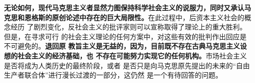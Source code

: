 \textbf{无论如何，现代马克思主义者显然力图保持科学社会主义的说服力，同时又承认马
  克思和恩格斯的原创论述中存在的巨大局限性。}在此过程中，后资本主义社会的概念经历
了剧烈变化，反社会主义的批评家则可以宣称取得了理论上的重大胜利。但是，在寻求可行
的社会主义理论的任何方案中，对这些有效的批判作出回应是不可避免的。\textbf{退回原
  教旨主义是无益的，因为，目前既不存在古典马克思主义设想的社会主义的经济基础，也
  不存在可能努力实现它的任何机构。}市场社会主义是否将成为人类历史的最终阶段，或者
是否只是向马克思原先提出的未来的“自由生产者联合体”进行漫长过渡的一部分，这仍然
是一个有待回答的问题。








